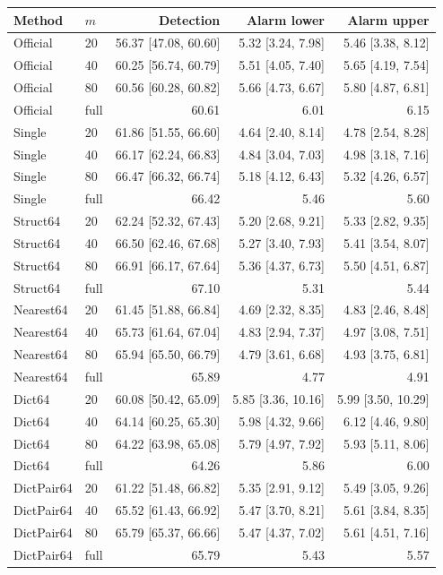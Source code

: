 \begin{tabular}{llrrr}
\toprule
Method & $m$ & Detection & Alarm lower & Alarm upper \\
\midrule
Official & 20 & 56.37 [47.08, 60.60] & 5.32 [3.24, 7.98] & 5.46 [3.38, 8.12] \\
Official & 40 & 60.25 [56.74, 60.79] & 5.51 [4.05, 7.40] & 5.65 [4.19, 7.54] \\
Official & 80 & 60.56 [60.28, 60.82] & 5.66 [4.73, 6.67] & 5.80 [4.87, 6.81] \\
Official & full & 60.61 & 6.01 & 6.15 \\
Single & 20 & 61.86 [51.55, 66.60] & 4.64 [2.40, 8.14] & 4.78 [2.54, 8.28] \\
Single & 40 & 66.17 [62.24, 66.83] & 4.84 [3.04, 7.03] & 4.98 [3.18, 7.16] \\
Single & 80 & 66.47 [66.32, 66.74] & 5.18 [4.12, 6.43] & 5.32 [4.26, 6.57] \\
Single & full & 66.42 & 5.46 & 5.60 \\
Struct64 & 20 & 62.24 [52.32, 67.43] & 5.20 [2.68, 9.21] & 5.33 [2.82, 9.35] \\
Struct64 & 40 & 66.50 [62.46, 67.68] & 5.27 [3.40, 7.93] & 5.41 [3.54, 8.07] \\
Struct64 & 80 & 66.91 [66.17, 67.64] & 5.36 [4.37, 6.73] & 5.50 [4.51, 6.87] \\
Struct64 & full & 67.10 & 5.31 & 5.44 \\
Nearest64 & 20 & 61.45 [51.88, 66.84] & 4.69 [2.32, 8.35] & 4.83 [2.46, 8.48] \\
Nearest64 & 40 & 65.73 [61.64, 67.04] & 4.83 [2.94, 7.37] & 4.97 [3.08, 7.51] \\
Nearest64 & 80 & 65.94 [65.50, 66.79] & 4.79 [3.61, 6.68] & 4.93 [3.75, 6.81] \\
Nearest64 & full & 65.89 & 4.77 & 4.91 \\
Dict64 & 20 & 60.08 [50.42, 65.09] & 5.85 [3.36, 10.16] & 5.99 [3.50, 10.29] \\
Dict64 & 40 & 64.14 [60.25, 65.30] & 5.98 [4.32, 9.66] & 6.12 [4.46, 9.80] \\
Dict64 & 80 & 64.22 [63.98, 65.08] & 5.79 [4.97, 7.92] & 5.93 [5.11, 8.06] \\
Dict64 & full & 64.26 & 5.86 & 6.00 \\
DictPair64 & 20 & 61.22 [51.48, 66.82] & 5.35 [2.91, 9.12] & 5.49 [3.05, 9.26] \\
DictPair64 & 40 & 65.52 [61.43, 66.92] & 5.47 [3.70, 8.21] & 5.61 [3.84, 8.35] \\
DictPair64 & 80 & 65.79 [65.37, 66.66] & 5.47 [4.37, 7.02] & 5.61 [4.51, 7.16] \\
DictPair64 & full & 65.79 & 5.43 & 5.57 \\
\bottomrule
\end{tabular}
